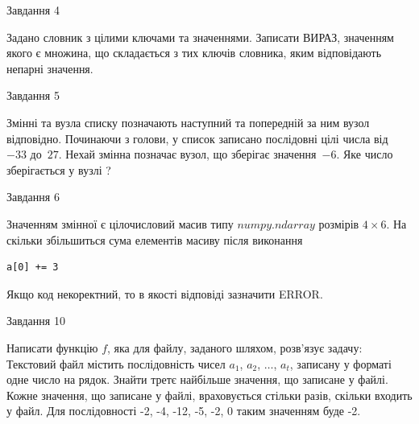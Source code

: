 \documentclass[12pt, ukrainian]{article}
\begin{document}
{\begin{minipage}[t]{8.0cm}
\end{minipage}


               
{\begin{center}Завдання {4}\end{center}}
\vspace{-4mm}
Задано словник  з цілими ключами та значеннями. Записати ВИРАЗ, значенням якого є множина, що складається  з тих ключів словника, яким відповідають непарні значення.\par

\vspace{10mm}
               
{\begin{center}Завдання {5}\end{center}}
\vspace{-4mm}
Змінні  та  вузла списку позначають наступний та попередній за ним вузол відповідно. Починаючи з голови, у список записано послідовні цілі числа від~$-33$ до~$27$. Нехай змінна  позначає вузол, що зберігає значення~$-6$.
Яке число зберігається у вузлі  ?\par

               
{\begin{center}Завдання {6}\end{center}}
\vspace{-4mm}
Значенням змінної  є цілочисловий масив типу $numpy.ndarray$ розмірів $4{\times}6$. На скільки збільшиться сума елементів масиву  після виконання
\begin{verbatim}
a[0] += 3
\end{verbatim}


Якщо код некоректний, то в якості відповіді зазначити ERROR.\par

               
{\begin{center}Завдання {10}\end{center}}
\vspace{-4mm}

Написати функцію $f$, яка для файлу, заданого шляхом, розв’язує задачу:\\ Текстовий файл містить послідовність чисел $a_1$, $a_2$, $\ldots$, $a_t$, записану у форматі одне число на рядок. Знайти третє найбільше значення, що записане у файлі. Кожне значення, що записане у файлі, враховується стільки разів, скільки входить у файл. Для послідовності -2, -4, -12, -5, -2, 0 таким значенням буде -2.

}
\end{document}
